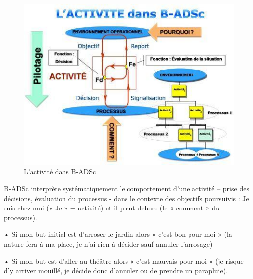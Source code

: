  
 \begin{figure}[H]
\begin{center}
\includegraphics[width=1\linewidth]{images/activite}
\end{center}
\caption{L'activité dans B-ADSc}
\label{fig:11}
\end{figure}

 
B-ADSc interprète systématiquement le comportement d’une activité – prise des décisions, évaluation du processus - dans le contexte des objectifs poursuivis :
Je suis chez moi (« Je » = activité) et il pleut dehors (le « comment » du processus).

• Si mon but initial est d’arroser le jardin alors « c’est bon pour moi » (la nature fera à ma place, je n'ai rien à décider sauf annuler l'arrosage) 

• Si mon but est d’aller au théâtre alors « c’est mauvais pour moi » (je risque d’y arriver mouillé, je décide donc d'annuler ou de prendre un parapluie).\cite{badsc} 
